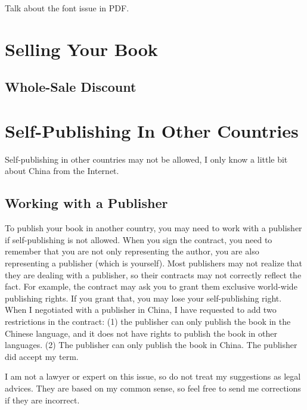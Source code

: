 Talk about the font issue in PDF.






\section{Selling Your Book}



\subsection{Whole-Sale Discount} 





\section{Self-Publishing In Other Countries}

Self-publishing in other countries may not be allowed, 
I only know a little bit about China from the Internet.



\subsection{Working with a Publisher}

To publish your book in another country, you may need to work
with a publisher if self-publishing is not allowed. When you sign
the contract, you need to remember that you are not only representing the author, 
you are also representing a
publisher (which is yourself). Most publishers may not realize that they 
are dealing with a publisher, so their contracts may not correctly reflect the fact. 
For example, the contract may ask you to grant them exclusive world-wide publishing rights. 
If you grant that, you may lose your self-publishing right.  
When I negotiated with a publisher in China, I have requested to add two restrictions in the 
contract: (1) the publisher can only publish the book in the Chinese language, 
and it does not have rights to publish the book in other languages. 
(2) The publisher can only publish the book in China. 
The publisher did accept my term. 


I am not a lawyer or expert on this issue, so do not treat my suggestions as 
legal advices. They are based on my common sense, so 
feel free to send me corrections if they are incorrect. 





